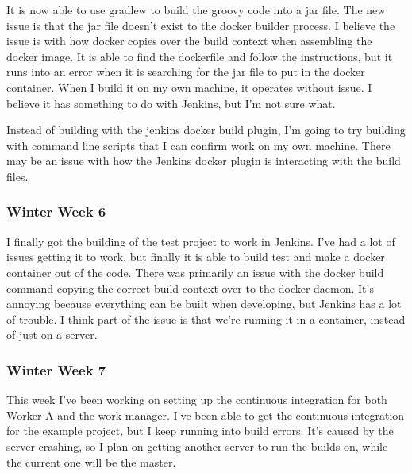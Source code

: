 \documentclass[onecolumn, draftclsnofoot,10pt, compsoc]{IEEEtran}
\begin{document}
It is now able to use gradlew to build the groovy code into a jar file.  
The new issue is that the jar file doesn't exist to the docker builder process.  
I believe the issue is with how docker copies over the build context when assembling the docker image.  
It is able to find the dockerfile and follow the instructions, but it runs into an error when it is searching for the jar file to put in the docker container.  
When I build it on my own machine, it operates without issue.  
I believe it has something to do with Jenkins, but I'm not sure what.

Instead of building with the jenkins docker build plugin, I'm going to try building with command line scripts that I can confirm work on my own machine. 
There may be an issue with how the Jenkins docker plugin is interacting with the build files.

\subsubsection*{Winter Week 6}
I finally got the building of the test project to work in Jenkins.  
I've had a lot of issues getting it to work, but finally it is able to build test and make a docker container out of the code.  
There was primarily an issue with the docker build command copying the correct build context over to the docker daemon.  
It's annoying because everything can be built when developing, but Jenkins has a lot of trouble.  
I think part of the issue is that we're running it in a container, instead of just on a server.

\subsubsection*{Winter Week 7}
This week I've been working on setting up the continuous integration for both Worker A and the work manager.  
I've been able to get the continuous integration for the example project, but I keep running into build errors. 
It's caused by the server crashing, so I plan on getting another server to run the builds on, while the current one will be the master.
\end{document}
